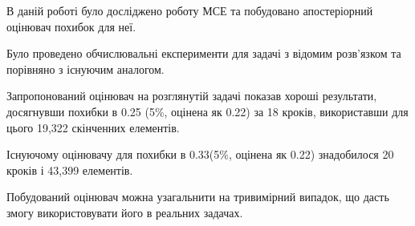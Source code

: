 

В даній роботі було досліджено роботу МСЕ та побудовано апостеріорний оцінювач похибок для неї.

Було проведено обчислювальні експерименти для задачі з відомим розв'язком та порівняно з існуючим аналогом.

Запропонований оцінювач на розглянутій задачі показав хороші результати, досягнувши похибки в 0.25 (5\%, оцінена як 0.22)  за 18 кроків, використавши для цього 19,322 скінченних елементів.

Існуючому оцінювачу для похибки в 0.33(5\%, оцінена як 0.22) знадобилося 20 кроків і 43,399 елементів.

Побудований оцінювач можна узагальнити на тривимірний випадок, що дасть змогу використовувати його в реальних задачах.

